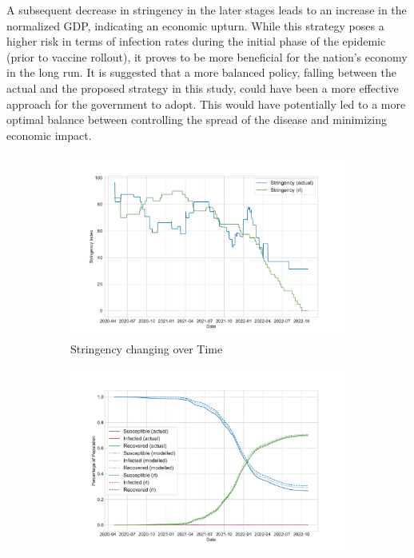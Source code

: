 \documentclass[tikz,fleqn,12pt]{wlscirep}
\begin{document}
A subsequent decrease in stringency in the later stages leads to an increase in the normalized GDP, indicating an economic upturn. While this strategy poses a higher risk in terms of infection rates during the initial phase of the epidemic (prior to vaccine rollout), it proves to be more beneficial for the nation's economy in the long run. It is suggested that a more balanced policy, falling between the actual and the proposed strategy in this study, could have been a more effective approach for the government to adopt. This would have potentially led to a more optimal balance between controlling the spread of the disease and minimizing economic impact.
\begin{figure}[htbp!]
  \centering
  \begin{subfigure}[t]{0.48\textwidth}
    \centering
    \includegraphics[width=\linewidth]{images/175975/rl_stringency.pdf}
    \caption{Stringency changing over Time}
  \end{subfigure}
  \label{fig:175975_rl_stringency}
  \hfill
  \begin{subfigure}[t]{0.48\textwidth}
    \centering
    \includegraphics[width=\linewidth]{images/175975/rl_sir.pdf}

\end{subfigure}
\end{figure}
\end{document}
